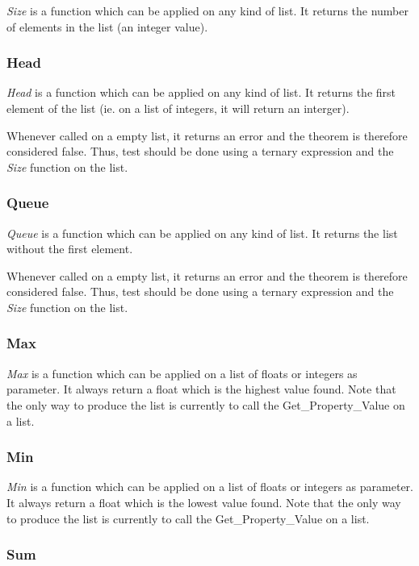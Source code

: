 \textit{Size} is a function which can be applied on any kind of list. 
It returns the number of elements in the list (an integer value).

\subsubsection {Head}

\textit{Head} is a function which can be applied on any kind of list. 
It returns the first element of the list (ie. on a list of integers, 
it will return an interger).

Whenever called on a empty list, it returns an error and the theorem 
is therefore considered false. Thus, test should be done using a 
ternary expression and the \textit{Size} function on the list.

\subsubsection {Queue}

\textit{Queue} is a function which can be applied on any kind of list. 
It returns the list without the first element.

Whenever called on a empty list, it returns an error and the theorem 
is therefore considered false. Thus, test should be done using a 
ternary expression and the \textit{Size} function on the list.

 \subsubsection {Max}

\textit {Max} is a function which can be applied on a list of 
floats or integers as parameter. It always return a float which 
is the highest value found. Note that the only way to produce 
the list is currently to call the Get\_Property\_Value on a list.
 
\subsubsection {Min}

\textit {Min} is a function which can be applied on a list of 
floats or integers as parameter. It always return a float which 
is the lowest value found. Note that the only way to produce the 
list is currently to call the Get\_Property\_Value on a list.
 
\subsubsection {Sum}

